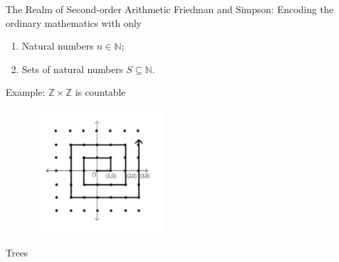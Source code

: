 \documentclass{beamer} %
\begin{document}
\begin{frame}{The Realm of Second-order Arithmetic}
    Friedman and Simpson: Encoding the ordinary mathematics with only 
    \begin{enumerate}
        \item Natural numbers $n \in \mathbb{N}$;
        \item Sets of natural numbers $S \subseteq \mathbb{N}$.
    \end{enumerate}
    \pause
    Example: $\mathbb{Z} \times \mathbb{Z}$ is countable
    \begin{figure}
        \includegraphics[width=5cm]{IMG_0607.jpg}
    \end{figure}
    
\end{frame}

\begin{frame}{Trees}
    \begin{figure}
    \end{figure}
\end{frame}
\end{document}
